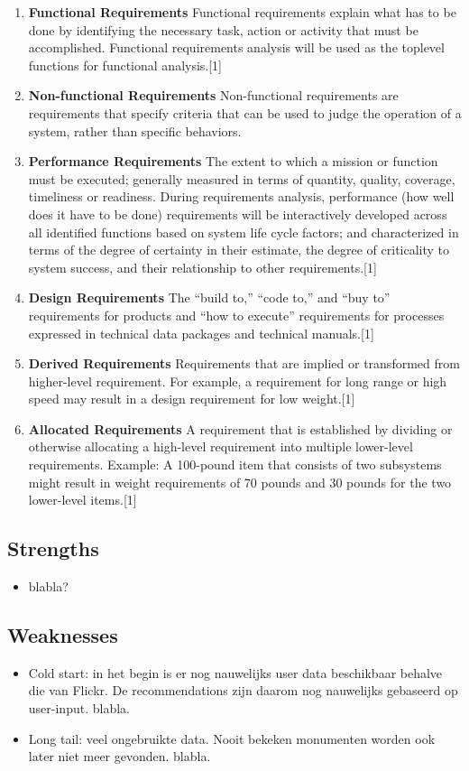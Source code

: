 \documentclass{article}
\begin{document}
\begin{enumerate}
	\item{\textbf{Functional Requirements}}
	Functional requirements explain what has to be done by identifying the necessary task, action or activity that must be accomplished. Functional requirements analysis will be used as the toplevel functions for functional analysis.[1]
	\item{\textbf{Non-functional Requirements}}
	Non-functional requirements are requirements that specify criteria that can be used to judge the operation of a system, rather than specific behaviors.
	\item{\textbf{Performance Requirements}}
	The extent to which a mission or function must be executed; generally measured in terms of quantity, quality, coverage, timeliness or readiness. During requirements analysis, performance (how well does it have to be done) requirements will be interactively developed across all identified functions based on system life cycle factors; and characterized in terms of the degree of certainty in their estimate, the degree of criticality to system success, and their relationship to other requirements.[1]
	\item{\textbf{Design Requirements}}
	The “build to,” “code to,” and “buy to” requirements for products and “how to execute” requirements for processes expressed in technical data packages and technical manuals.[1]
	\item{\textbf{Derived Requirements}}
	Requirements that are implied or transformed from higher-level requirement. For example, a requirement for long range or high speed may result in a design requirement for low weight.[1]
\item{\textbf{Allocated Requirements}}
	A requirement that is established by dividing or otherwise allocating a high-level requirement into multiple lower-level requirements. Example: A 100-pound item that consists of two subsystems might result in weight requirements of 70 pounds and 30 pounds for the two lower-level items.[1]
	
\end{enumerate}
\subsection{Strengths}
\begin{itemize}
\item blabla?
\end{itemize}
\subsection{Weaknesses}
\begin{itemize}
\item Cold start: in het begin is er nog nauwelijks user data beschikbaar behalve die van Flickr. De recommendations zijn daarom nog nauwelijks gebaseerd op user-input. blabla.
\item Long tail: veel ongebruikte data. Nooit bekeken monumenten worden ook later niet meer gevonden. blabla.
\end{itemize}
\end{document}
